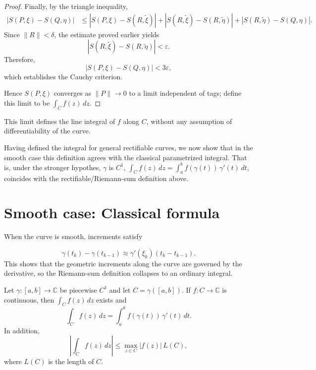 \documentclass{article}
\begin{document}
\begin{proof}
Finally, by the triangle inequality,
\[
\begin{aligned}
|S(P,\xi)-S(Q,\eta)|
&\le
|S(P,\xi)-S(R,\tilde\xi)|
+
|S(R,\tilde\xi)-S(R,\tilde\eta)|
+
|S(R,\tilde\eta)-S(Q,\eta)|.
\end{aligned}
\]
Since $\|R\|<\delta$, the estimate proved earlier yields
\[
|S(R,\tilde\xi)-S(R,\tilde\eta)|<\varepsilon.
\]
Therefore,
\[
|S(P,\xi)-S(Q,\eta)|<3\varepsilon,
\]
which establishes the Cauchy criterion.


 Hence $S(P,\xi)$ converges as $\|P\|\to 0$ to a limit
independent of tags; define this limit to be $\int_C f(z)\,dz$.
\end{proof}
This limit defines the line integral of $f$ along $C$, without any assumption of differentiability of the curve.

Having defined the integral for general rectifiable curves, we now show that in the smooth case this definition agrees with the classical parametrized integral. That is, under the stronger hypothes, $\gamma$ is $C^1$,  $\int_C f(z)\,dz=\int_a^b f(\gamma(t))\,\gamma'(t)\,dt$, coincides with the rectifiable/Riemann-sum definition above.

\section{Smooth case: Classical formula}

When the curve is smooth, increments satisfy

\[
\gamma(t_k) - \gamma(t_{k-1}) \approx \gamma'(\xi_k)(t_k - t_{k-1}).
\]
This shows that the geometric increments along the curve are governed by the derivative, so the Riemann-sum definition collapses to an ordinary integral.
\begin{theorem}
Let $\gamma:[a,b]\to\mathbb C$ be piecewise $C^1$ and let $C=\gamma([a,b])$.
If $f:C\to\mathbb C$ is continuous, then $\int_C f(z)\,dz$ exists and
\[
\int_C f(z)\,dz=\int_a^b f(\gamma(t))\,\gamma'(t)\,dt.
\]
In addition,
\[
\left|\int_C f(z)\,dz\right|\le \max_{z\in C}|f(z)|\,L(C),
\]
where $L(C)$ is the length of $C$.
\end{theorem}
\end{document}
